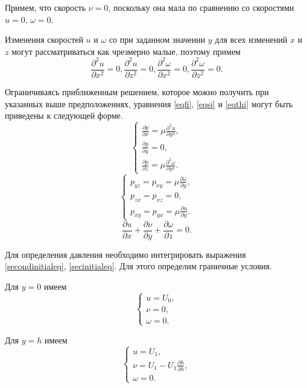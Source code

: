 \documentclass[a4paper,14pt]{extarticle}
\begin{document}
Примем, что скорость $\nu = 0$, поскольку она мала по сравнению со скоростями $u = 0$, $\omega = 0$.

Изменения скоростей $u$ и $\omega$ со при заданном значении $y$ для всех изменений $ x $ и $z$ могут рассматриваться как чрезмерно малые, поэтому примем
\[
\frac{\partial^2 u}{\partial x^2} = 0, 
\frac{\partial^2 u}{\partial z^2} = 0, 
\frac{\partial^2 \omega}{\partial x^2} = 0, 
\frac{\partial^2 \omega}{\partial z^2} = 0. 
\]

Ограничиваясь приближенным решением, которое можно
получить при указанных выше предположениях, уравнения \eqref{eqfi}, \eqref{eqsi} и \eqref{eqthi} могут быть приведены к следующей форме.
\begin{equation}
	\label{secondinitialeq}
	\begin{cases}
		\frac{\partial p }{\partial x} = \mu \frac{\partial^2 u}{\partial y^2}, \\
		\frac{\partial p }{\partial y} = 0, \\
		\frac{\partial p }{\partial z} = \mu \frac{\partial^2 \omega}{\partial y^2}.
	\end{cases}
\end{equation}
\begin{equation}
	\label{secinitialeq}
	\begin{cases}
		p_{yz} = p_{xy} = \mu \frac{\partial \omega}{\partial y}, \\
		p_{zx} = p_{xz} = 0, \\
		p_{xy} = p_{yx} = \mu \frac{\partial u}{\partial y}.
	\end{cases}
\end{equation}
\begin{equation*}
	\frac{\partial u}{\partial x} + \frac{\partial \nu}{\partial y} + \frac{\partial \omega}{\partial z} = 0.
\end{equation*}

Для определения давления необходимо интегрировать выражения \eqref{secondinitialeq}, \eqref{secinitialeq}. Для этого определим граничные условия.

\noindent Для $y = 0$ имеем
\[
\begin{cases}
	u = U_0, \\
	\nu = 0, \\
	\omega = 0.
\end{cases}
\]

\noindent Для $y = h$ имеем
\[
\begin{cases}
	u = U_1, \\ 
	\nu = U_1 - U_1 \frac{\partial  h}{\partial h}, \\ \omega = 0.
\end{cases}
\]
\end{document}
